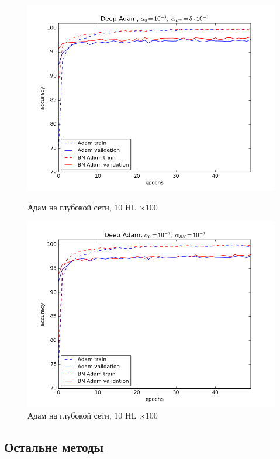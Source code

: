 \documentclass[12pt,oneside]{article}
\begin{document}
\begin{figure}[h!]
\centering
\begin{minipage}{0.45\textwidth}
\includegraphics[scale=0.45]{images/mnistDeepAdam1.png}
\caption{\small Адам на глубокой сети, $10$ HL $\times 100$}
\end{minipage} \hfill
\begin{minipage}{0.45\textwidth}
\includegraphics[scale=0.45]{images/mnistDeepAdam2.png}
\caption{\small Адам на глубокой сети, $10$ HL $\times 100$}
\end{minipage}
\end{figure}


\newpage
\subsection{Остальне методы}
\end{document}
